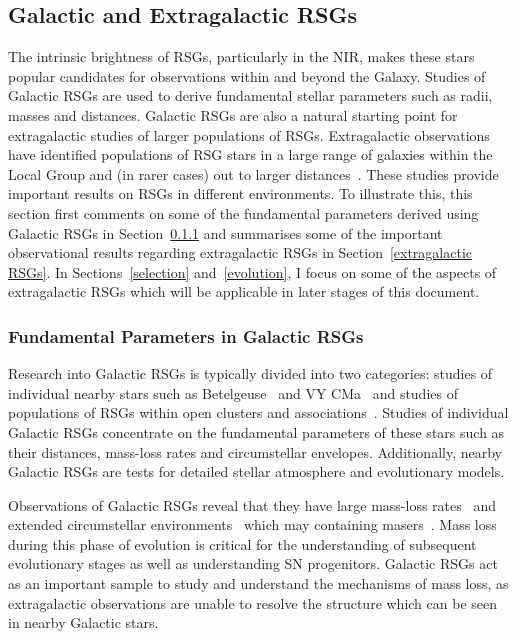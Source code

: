 \subsection{Galactic and Extragalactic RSGs} %
\label{sub:galactic_and_extragalactic_rsgs}

The intrinsic brightness of RSGs, particularly in the NIR, makes these stars popular candidates for observations within and beyond the Galaxy.
Studies of Galactic RSGs are used to derive fundamental stellar parameters such as radii, masses and distances.
Galactic RSGs are also a natural starting point for extragalactic studies of larger populations of RSGs.
Extragalactic observations have identified populations of RSG stars in a large range of galaxies within the Local Group and (in rarer cases) out to larger distances~\citep[e.g.][]{Elias85,Humphreys86, Massey06, Massey07, Groenewegen09,Massey13}. %
These studies provide important results on RSGs in different environments.
To illustrate this, this section first comments on some of the fundamental parameters derived using Galactic RSGs in Section~\ref{Galactic RSGs} and summarises some of the important observational results regarding extragalactic RSGs in Section~\ref{extragalactic RSGs}.
In Sections~\ref{selection} and~\ref{evolution}, I focus on some of the aspects of extragalactic RSGs which will be applicable in later stages of this document.

\subsubsection{Fundamental Parameters in Galactic RSGs}\label{Galactic RSGs}

Research into Galactic RSGs is typically divided into two categories: studies of individual nearby stars such as Betelgeuse~\citep[$197\pm 45$pc;][]{Harper08} and VY CMa~\citep[$1420\pm$ 120pc;][]{Wittowski12} and studies of populations of RSGs within open clusters and associations~\citep[e.g.][]{Levesque05,Negueruela13}.
Studies of individual Galactic RSGs concentrate on the fundamental parameters of these stars such as their distances, mass-loss rates and circumstellar envelopes.
Additionally, nearby Galactic RSGs are tests for detailed stellar atmosphere and evolutionary models.

Observations of Galactic RSGs reveal that they have large mass-loss rates~\citep[10$^{-(6\pm 1)}$M$_{\odot}$yr$^{-1}$;][]{Danchi94, Richards13} and extended circumstellar environments~\citep{Smith01} which may containing masers~\citep{Schuster06}.
Mass loss during this phase of evolution is critical for the understanding of subsequent evolutionary stages as well as understanding SN progenitors.
Galactic RSGs act as an important sample to study and understand the mechanisms of mass loss, as extragalactic observations are unable to resolve the structure which can be seen in nearby Galactic stars.

